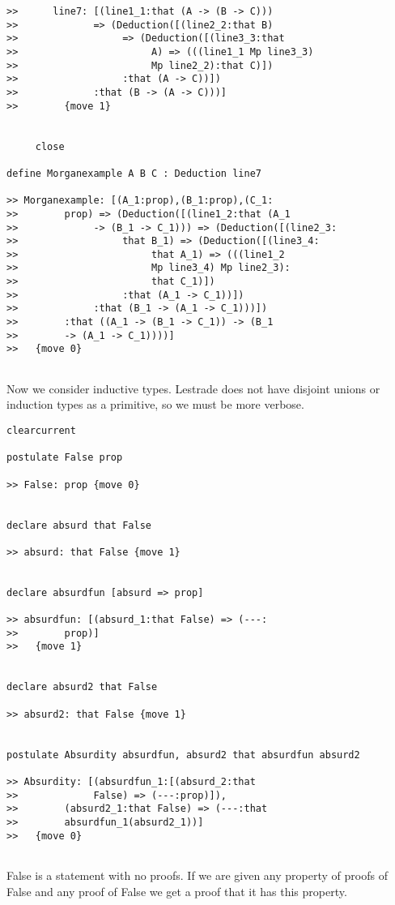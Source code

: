 \documentclass[12pt]{article}
\begin{document}
\begin{verbatim}
>>      line7: [(line1_1:that (A -> (B -> C))) 
>>             => (Deduction([(line2_2:that B) 
>>                  => (Deduction([(line3_3:that 
>>                       A) => (((line1_1 Mp line3_3) 
>>                       Mp line2_2):that C)])
>>                  :that (A -> C))])
>>             :that (B -> (A -> C)))]
>>        {move 1}


     close

define Morganexample A B C : Deduction line7

>> Morganexample: [(A_1:prop),(B_1:prop),(C_1:
>>        prop) => (Deduction([(line1_2:that (A_1 
>>             -> (B_1 -> C_1))) => (Deduction([(line2_3:
>>                  that B_1) => (Deduction([(line3_4:
>>                       that A_1) => (((line1_2 
>>                       Mp line3_4) Mp line2_3):
>>                       that C_1)])
>>                  :that (A_1 -> C_1))])
>>             :that (B_1 -> (A_1 -> C_1)))])
>>        :that ((A_1 -> (B_1 -> C_1)) -> (B_1 
>>        -> (A_1 -> C_1))))]
>>   {move 0}


\end{verbatim}

Now we consider inductive types.  Lestrade does not have disjoint unions or induction types as a primitive, so we must be more verbose.

\begin{verbatim}
clearcurrent

postulate False prop

>> False: prop {move 0}


declare absurd that False

>> absurd: that False {move 1}


declare absurdfun [absurd => prop]

>> absurdfun: [(absurd_1:that False) => (---:
>>        prop)]
>>   {move 1}


declare absurd2 that False

>> absurd2: that False {move 1}


postulate Absurdity absurdfun, absurd2 that absurdfun absurd2

>> Absurdity: [(absurdfun_1:[(absurd_2:that 
>>             False) => (---:prop)]),
>>        (absurd2_1:that False) => (---:that 
>>        absurdfun_1(absurd2_1))]
>>   {move 0}


\end{verbatim}

False is a statement with no proofs.  If we are given any property of proofs of False and any proof of False we get a proof that it has this property.
\end{document}
